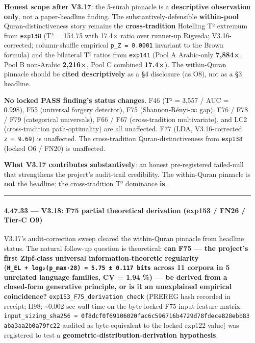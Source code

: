 \documentclass[
]{article}
\begin{document}
\textbf{Honest scope after V3.17}: the 5-sūrah pinnacle is a
\textbf{descriptive observation only}, not a paper-headline finding. The
substantively-defensible \textbf{within-pool} Quran-distinctiveness
story remains the \textbf{cross-tradition} Hotelling T² extremum from
\texttt{exp138} (T² = 154.75 with 17.4× ratio over runner-up Rigveda;
V3.16-corrected; column-shuffle empirical \texttt{p\_Z\ =\ 0.0001}
invariant to the Brown formula) and the bilateral T² ratios from
\texttt{exp141} (Pool A Arabic-only \textbf{7,884×}, Pool B non-Arabic
\textbf{2,216×}, Pool C combined \textbf{17.4×}). The within-Quran
pinnacle should be \textbf{cited descriptively} as a §4 disclosure (as
O8), not as a §3 headline.

\textbf{No locked PASS finding's status changes}. F46 (T² = 3,557 / AUC
= 0.998), F55 (universal forgery detector), F75 (Shannon-Rényi-∞ gap),
F76 / F78 / F79 (categorical universals), F66 / F67 (cross-tradition
multivariate), and LC2 (cross-tradition path-optimality) are all
unaffected. F77 (LDA, V3.16-corrected
\texttt{\textbar{}z\textbar{}\ =\ 9.69}) is unaffected. The
cross-tradition Quran-distinctiveness from \texttt{exp138} (locked O6 /
FN20) is unaffected.

\textbf{What V3.17 contributes substantively}: an honest pre-registered
failed-null that strengthens the project's audit-trail credibility. The
within-Quran pinnacle is \textbf{not} the headline; the cross-tradition
T² dominance \textbf{is}.

\begin{center}\rule{0.5\linewidth}{0.5pt}\end{center}

\paragraph{4.47.33 --- V3.18: F75 partial theoretical derivation (exp153
/ FN26 / Tier-C
O9)}\label{v3.18-f75-partial-theoretical-derivation-exp153-fn26-tier-c-o9}

V3.17's audit-correction sweep cleared the within-Quran pinnacle from
headline status. The natural follow-up question is theoretical:
\textbf{can F75 --- the project's first Zipf-class universal
information-theoretic regularity
(\texttt{H\_EL\ +\ log₂(p\_max·28)\ ≈\ 5.75\ ±\ 0.117\ bits} across 11
corpora in 5 unrelated language families, CV = 1.94 \%) --- be derived
from a closed-form generative principle, or is it an unexplained
empirical coincidence?} \texttt{exp153\_F75\_derivation\_check} (PREREG
hash recorded in receipt; H98; \textasciitilde0.002 sec wall-time on the
byte-locked F75 input feature matrix;
\texttt{input\_sizing\_sha256\ =\ 0f8dcf0f69106020fac6c596716b4729d78fdece828ebb83aba3aa2b0a79fc22}
audited as byte-equivalent to the locked exp122 value) was registered to
test a \textbf{geometric-distribution-derivation hypothesis}.
\end{document}

